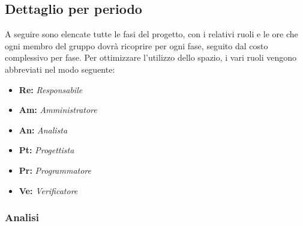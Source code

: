 \subsection{Dettaglio per periodo}\label{sec:preventivo:periodi}
A seguire sono elencate tutte le fasi del progetto, con i relativi ruoli e le ore che ogni membro del gruppo dovrà ricoprire per ogni fase, seguito dal costo complessivo per fase. Per ottimizzare l'utilizzo dello spazio, i vari ruoli vengono abbreviati nel modo seguente:\\
\begin{itemize}
    \item \textbf{Re:} \textit{Responsabile}
    \item \textbf{Am:} \textit{Amministratore}
    \item \textbf{An:} \textit{Analista}
    \item \textbf{Pt:} \textit{Progettista}
    \item \textbf{Pr:} \textit{Programmatore}
    \item \textbf{Ve:} \textit{Verificatore}
\end{itemize}


\subsubsection{Analisi}\label{sec:preventivo:periodi:analisi}

